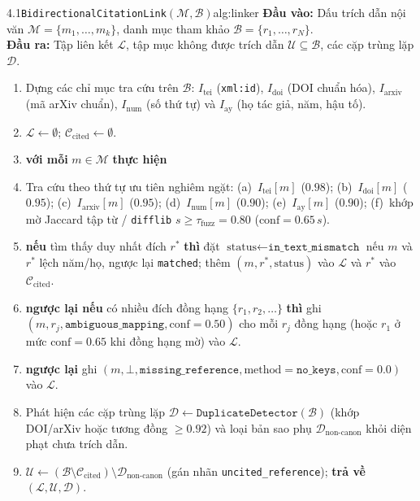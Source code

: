 \begin{citraalgo}{4.1}{\texttt{BidirectionalCitationLink}$(\mathcal{M}, \mathcal{B})$}{alg:linker}
\textbf{Đầu vào:} Dấu trích dẫn nội văn $\mathcal{M} = \{m_1, \dots, m_k\}$, danh mục tham khảo $\mathcal{B} = \{r_1, \dots, r_N\}$.\\
\textbf{Đầu ra:} Tập liên kết $\mathcal{L}$, tập mục không được trích dẫn $\mathcal{U} \subseteq \mathcal{B}$, các cặp trùng lặp $\mathcal{D}$.
{\setlength{\leftmargini}{1.6em}
\begin{enumerate}\setlength{\itemsep}{1pt}\setlength{\parskip}{0pt}
\item Dựng các chỉ mục tra cứu trên $\mathcal{B}$: $I_{\text{tei}}$ (\texttt{xml:id}), $I_{\text{doi}}$ (DOI chuẩn hóa), $I_{\text{arxiv}}$ (mã arXiv chuẩn), $I_{\text{num}}$ (số thứ tự) và $I_{\text{ay}}$ (họ tác giả, năm, hậu tố).
\item $\mathcal{L} \leftarrow \emptyset$; $\mathcal{C}_{\text{cited}} \leftarrow \emptyset$.
\item \textbf{với mỗi} $m \in \mathcal{M}$ \textbf{thực hiện}
\item \quad Tra cứu theo thứ tự ưu tiên nghiêm ngặt: (a)~$I_{\text{tei}}[m]$ ($0.98$); (b)~$I_{\text{doi}}[m]$ ($0.95$); (c)~$I_{\text{arxiv}}[m]$ ($0.95$); (d)~$I_{\text{num}}[m]$ ($0.90$); (e)~$I_{\text{ay}}[m]$ ($0.90$); (f)~khớp mờ Jaccard tập từ / \texttt{difflib} $s \ge \tau_{\text{fuzz}} = 0.80$ ($\text{conf} = 0.65\,s$).
\item \quad \textbf{nếu} tìm thấy duy nhất đích $r^*$ \textbf{thì} đặt $\text{status} \leftarrow \texttt{in\_text\_mismatch}$ nếu $m$ và $r^*$ lệch năm/họ, ngược lại \texttt{matched}; thêm $(m, r^*, \text{status})$ vào $\mathcal{L}$ và $r^*$ vào $\mathcal{C}_{\text{cited}}$.
\item \quad \textbf{ngược lại nếu} có nhiều đích đồng hạng $\{r_1, r_2, \dots\}$ \textbf{thì} ghi $(m, r_j, \texttt{ambiguous\_mapping}, \text{conf}=0.50)$ cho mỗi $r_j$ đồng hạng (hoặc $r_1$ ở mức $\text{conf}=0.65$ khi đồng hạng mờ) vào $\mathcal{L}$.
\item \quad \textbf{ngược lại} ghi $(m, \bot, \texttt{missing\_reference}, \text{method}=\texttt{no\_keys}, \text{conf}=0.0)$ vào $\mathcal{L}$.
\item Phát hiện các cặp trùng lặp $\mathcal{D} \leftarrow \texttt{DuplicateDetector}(\mathcal{B})$ (khớp DOI/arXiv hoặc tương đồng $\ge 0.92$) và loại bản sao phụ $\mathcal{D}_{\text{non-canon}}$ khỏi diện phạt chưa trích dẫn.
\item $\mathcal{U} \leftarrow (\mathcal{B} \setminus \mathcal{C}_{\text{cited}}) \setminus \mathcal{D}_{\text{non-canon}}$ (gán nhãn \texttt{uncited\_reference}); \textbf{trả về} $(\mathcal{L}, \mathcal{U}, \mathcal{D})$.
\end{enumerate}}
\end{citraalgo}

